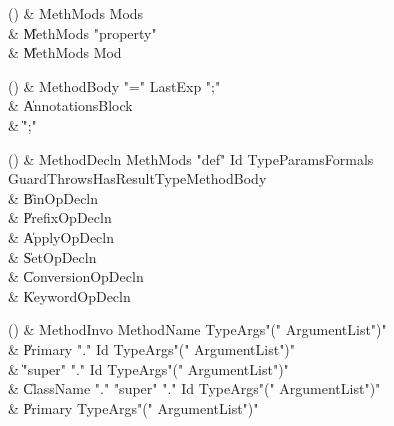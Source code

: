 \begin{bbgrammarappendix}{4.2in}

() & MethMods \label{prod:MethMods}  \: Mods\opt  \\

 &    \| MethMods \xcd"property"  \\
 &    \| MethMods Mod \\

\end{bbgrammarappendix}

\begin{bbgrammarappendix}{4.0in}

() & MethodBody \label{prod:MethodBody}  \: \xcd"=" LastExp \xcd";"  \\
 &    \| Annotations\opt Block \\
 &    \| \xcd";" \\

\end{bbgrammarappendix}

\begin{bbgrammarappendix}{3.9in}

() & MethodDecln
  \label{prod:MethodDecln}  \: MethMods \xcd"def" Id TypeParams\opt Formals Guard\opt Throws\opt HasResultType\opt MethodBody  \\

 &    \| BinOpDecln \\
 &    \| PrefixOpDecln \\
 &    \| ApplyOpDecln \\
 &    \| SetOpDecln \\
 &    \| ConversionOpDecln \\
 &    \| KeywordOpDecln \\

\end{bbgrammarappendix}

\begin{bbgrammarappendix}{4.0in}

() & MethodInvo \label{prod:MethodInvo}  \: MethodName TypeArgs\opt \xcd"(" ArgumentList\opt \xcd")"  \\

 &    \| Primary \xcd"." Id TypeArgs\opt \xcd"(" ArgumentList\opt \xcd")" \\
 &    \| \xcd"super" \xcd"." Id TypeArgs\opt \xcd"(" ArgumentList\opt \xcd")" \\
 &    \| ClassName \xcd"." \xcd"super"  \xcd"." Id TypeArgs\opt \xcd"(" ArgumentList\opt \xcd")" \\
 &    \| Primary TypeArgs\opt \xcd"(" ArgumentList\opt \xcd")" \\

\end{bbgrammarappendix}

